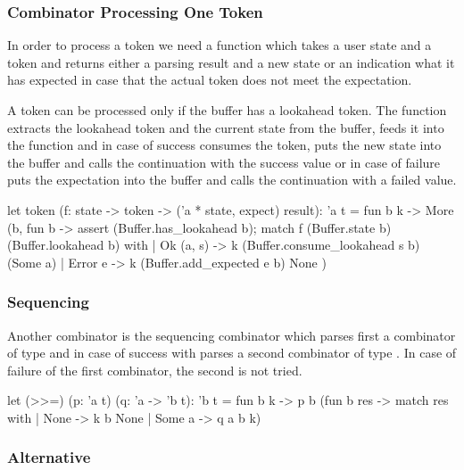 \subsubsection{Combinator Processing One Token}

In order to process a token we need a function which takes a user state and a
token and returns either a parsing result and a new state or an indication
what it has expected in case that the actual token does not meet the
expectation.

A token can be processed only if the buffer has a lookahead token. The
 function extracts the lookahead token and the current state from
the buffer, feeds it into the function and in case of success consumes the
token, puts the new state into the buffer and calls the continuation with the
success value or in case of failure puts the expectation into the buffer and
calls the continuation with a failed value.

\begin{ocaml}
  let token (f: state -> token -> ('a * state, expect) result): 'a t =
    fun b k ->
      More (b,
            fun b ->
              assert (Buffer.has_lookahead b);
              match f (Buffer.state b) (Buffer.lookahead b) with
              | Ok (a, s) ->
                 k (Buffer.consume_lookahead s b) (Some a)
              | Error e ->
                 k (Buffer.add_expected e b) None
           )
\end{ocaml}




\subsubsection{Sequencing}


Another combinator is the sequencing combinator which parses first a
combinator of type  and in case of success with
 parses a second combinator of type . In case of
failure of the first combinator, the second is not tried.

\begin{ocaml}
  let (>>=) (p: 'a t) (q: 'a -> 'b t): 'b t =
    fun b k ->
      p b
        (fun b res ->
           match res with
           | None ->
               k b None
           | Some a ->
               q a b k)
\end{ocaml}



\subsubsection{Alternative}


